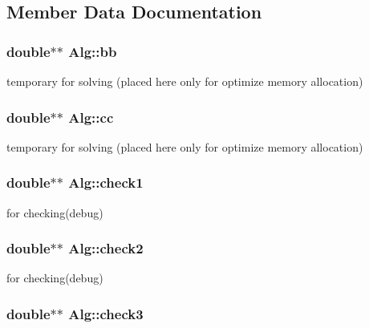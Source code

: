 \subsection{Member Data Documentation}
\hypertarget{classAlg_a325514811e51f84c9f45d910f61cd57b}{
\subsubsection[{bb}]{\setlength{\rightskip}{0pt plus 5cm}double$\ast$$\ast$ {\bf Alg::bb}}}
\label{classAlg_a325514811e51f84c9f45d910f61cd57b}
temporary for solving (placed here only for optimize memory allocation) \hypertarget{classAlg_a80d1cd9b48cd0e83fadbb02058e889c2}{
\subsubsection[{cc}]{\setlength{\rightskip}{0pt plus 5cm}double$\ast$$\ast$ {\bf Alg::cc}}}
\label{classAlg_a80d1cd9b48cd0e83fadbb02058e889c2}
temporary for solving (placed here only for optimize memory allocation) \hypertarget{classAlg_a243ec21fdadb52db5eb1908f6ac2b493}{
\subsubsection[{check1}]{\setlength{\rightskip}{0pt plus 5cm}double$\ast$$\ast$ {\bf Alg::check1}}}
\label{classAlg_a243ec21fdadb52db5eb1908f6ac2b493}
for checking(debug) \hypertarget{classAlg_a133497b0dd41c024c1cb3278903c69ff}{
\subsubsection[{check2}]{\setlength{\rightskip}{0pt plus 5cm}double$\ast$$\ast$ {\bf Alg::check2}}}
\label{classAlg_a133497b0dd41c024c1cb3278903c69ff}
for checking(debug) \hypertarget{classAlg_a595d62a49951a021c9cc071f0079a21a}{
\subsubsection[{check3}]{\setlength{\rightskip}{0pt plus 5cm}double$\ast$$\ast$ {\bf Alg::check3}}}
